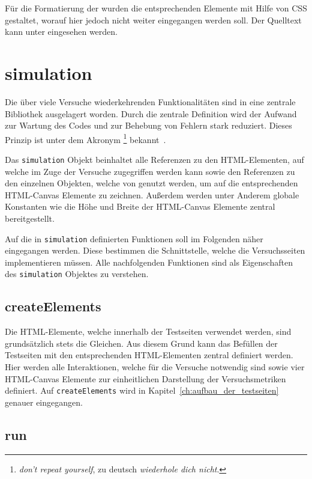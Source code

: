 Für die Formatierung der  wurden die entsprechenden Elemente mit Hilfe von CSS gestaltet, worauf hier jedoch nicht weiter eingegangen werden soll.
Der Quelltext kann unter  eingesehen werden.

\section{simulation}\label{ch:simulation_js}

Die über viele Versuche wiederkehrenden Funktionalitäten sind in eine zentrale Bibliothek ausgelagert worden.
Durch die zentrale Definition wird der Aufwand zur Wartung des Codes und zur Behebung von Fehlern stark reduziert.
Dieses Prinzip ist unter dem Akronym \footnote{\textit{don't repeat yourself}, zu deutsch \textit{wiederhole dich nicht}.} bekannt~\cite{AndrewHunt2021}.

Das \lstinline{simulation} Objekt beinhaltet alle Referenzen zu den HTML-Elementen, auf welche im Zuge der Versuche zugegriffen werden kann sowie den Referenzen zu den einzelnen  Objekten, welche von  genutzt werden, um auf die entsprechenden HTML-Canvas Elemente zu zeichnen.
Au{\ss}erdem werden unter Anderem globale Konstanten wie die Höhe und Breite der HTML-Canvas Elemente zentral bereitgestellt.

Auf die in \lstinline{simulation} definierten Funktionen soll im Folgenden näher eingegangen werden.
Diese bestimmen die Schnittstelle, welche die Versuchsseiten implementieren müssen.
Alle nachfolgenden Funktionen sind als Eigenschaften des \lstinline{simulation} Objektes zu verstehen.

\subsection{createElements}\label{ch:sim_createElements}

Die HTML-Elemente, welche innerhalb der Testseiten verwendet werden, sind grundsätzlich stets die Gleichen.
Aus diesem Grund kann das Befüllen der Testseiten mit den entsprechenden HTML-Elementen zentral definiert werden.
Hier werden alle Interaktionen, welche für die Versuche notwendig sind sowie vier HTML-Canvas Elemente zur einheitlichen Darstellung der Versuchsmetriken definiert.
Auf \lstinline{createElements} wird in Kapitel~\ref{ch:aufbau_der_testseiten} genauer eingegangen.

\subsection{run}\label{ch:sim_run}

